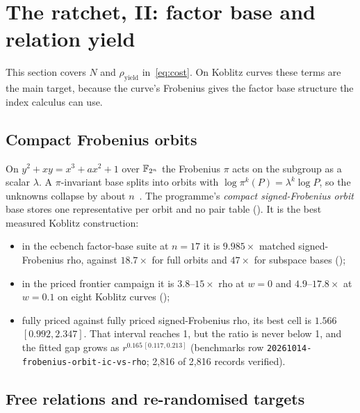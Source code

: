 \section{The ratchet, II: factor base and relation yield}\label{sec:basis}

This section covers $N$ and $\rho_{\mathrm{yield}}$ in~\eqref{eq:cost}. On
Koblitz curves these terms are the main target, because the curve's
Frobenius gives the factor base structure the index calculus can use.

\subsection{Compact Frobenius orbits}

On $y^2+xy=x^3+ax^2+1$ over $\mathbb{F}_{2^n}$ the Frobenius $\pi$ acts on the
subgroup as a scalar $\lambda$. A $\pi$-invariant base splits into orbits
with $\log\pi^k(P)=\lambda^k\log P$, so the unknowns collapse by about
$n$~\cite{ggmp2020}. The programme's \emph{compact signed-Frobenius orbit}
base stores one representative per orbit and no pair table
(). It is the best measured Koblitz
construction:
\begin{itemize}
\item in the ecbench factor-base suite at $n=17$ it is $9.985\times$
  matched signed-Frobenius rho, against $18.7\times$ for full orbits and
  $47\times$ for subspace bases ();
\item in the priced frontier campaign it is $3.8$--$15\times$ rho at $w=0$
  and $4.9$--$17.8\times$ at $w=0.1$ on eight Koblitz curves
  ();
\item fully priced against fully priced signed-Frobenius rho, its best cell
  is $1.566$ $[0.992,2.347]$. That interval reaches 1, but the ratio is
  never below 1, and the fitted gap grows as $r^{0.165\,[0.117,0.213]}$
  (benchmarks row \texttt{20261014-frobenius-orbit-ic-vs-rho}; 2{,}816 of
  2{,}816 records verified).
\end{itemize}

\subsection{Free relations and re-randomised targets}

